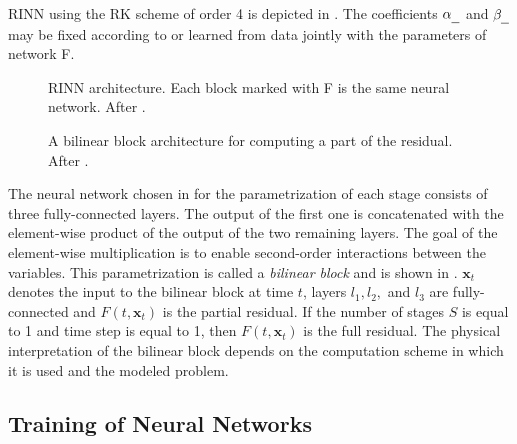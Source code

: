 \Ac{RINN} using the \ac{RK} scheme of order 4 is depicted in . The coefficients $\alpha_\text{\underline{\hspace{2mm}}}$ and $\beta_\text{\underline{\hspace{2mm}}}$ may be fixed according to  or learned from data jointly with the parameters of network F.

\begin{figure}
  \centering
  \scalebox{0.83}{}
  \caption{\Acl{RINN} architecture. Each block marked with F is the same neural network. After \cite{Fablet2017}.}
  \label{fig:rinn4}
\end{figure}

\begin{figure}
  \centering
  \scalebox{0.7}{}
  \caption{A bilinear block architecture for computing a part of the residual. After \cite{Fablet2017}.}
  \label{fig:bilinear_block}
\end{figure}

The neural network chosen in \cite{Ouala2019}
for the parametrization of each stage consists of three fully-connected layers. The output of the first one is concatenated with the element-wise product of the output of the two remaining layers. The goal of the element-wise multiplication is to enable second-order interactions between the variables. This parametrization is called a \emph{bilinear block} \cite{Fablet2017} and is shown in . $\pmb{x}_t$ denotes the input to the bilinear block at time $t$, layers $l_1, l_2,$ and $l_3$ are fully-connected and $F(t, \pmb{x}_t)$ is the partial residual. If the number of stages $S$ is equal to 1 and time step is equal to 1, then $F(t, \pmb{x}_t)$ is the full residual. The physical interpretation of the bilinear block depends on the computation scheme in which it is used and the modeled problem.



\subsection{Training of Neural Networks}

